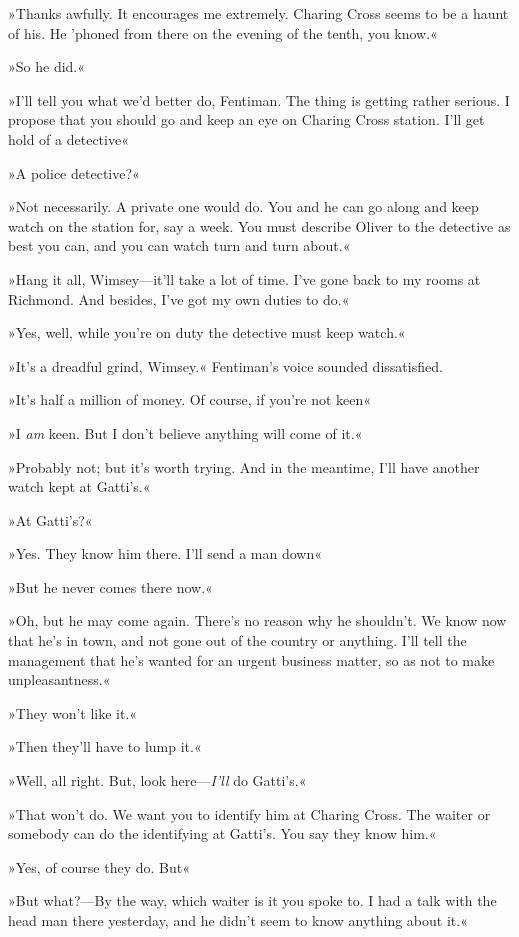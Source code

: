 »Thanks awfully. It encourages me extremely. Charing Cross seems to be a haunt of his. He 'phoned from there on the evening of the tenth, you know.«

»So he did.«

»I'll tell you what we'd better do, Fentiman. The thing is getting rather serious. I propose that you should go and keep an eye on Charing Cross station. I'll get hold of a detective\longdash«

»A police detective?«

»Not necessarily. A private one would do. You and he can go along and keep watch on the station for, say a week. You must describe Oliver to the detective as best you can, and you can watch turn and turn about.«

»Hang it all, Wimsey—it'll take a lot of time. I've gone back to my rooms at Richmond. And besides, I've got my own duties to do.«

»Yes, well, while you're on duty the detective must keep watch.«

»It's a dreadful grind, Wimsey.« Fentiman's voice sounded dissatisfied.

»It's half a million of money. Of course, if you're not keen\longdash«

»I \textit{am} keen. But I don't believe anything will come of it.«

»Probably not; but it's worth trying. And in the meantime, I'll have another watch kept at Gatti's.«

»At Gatti's?«

»Yes. They know him there. I'll send a man down\longdash«

»But he never comes there now.«

»Oh, but he may come again. There's no reason why he shouldn't. We know now that he's in town, and not gone out of the country or anything. I'll tell the management that he's wanted for an urgent business matter, so as not to make unpleasantness.«

»They won't like it.«

»Then they'll have to lump it.«

»Well, all right. But, look here—\textit{I'll} do Gatti's.«

»That won't do. We want you to identify him at Charing Cross. The waiter or somebody can do the identifying at Gatti's. You say they know him.«

»Yes, of course they do. But\longdash«

»But what?—By the way, which waiter is it you spoke to. I had a talk with the head man there yesterday, and he didn't seem to know anything about it.«

